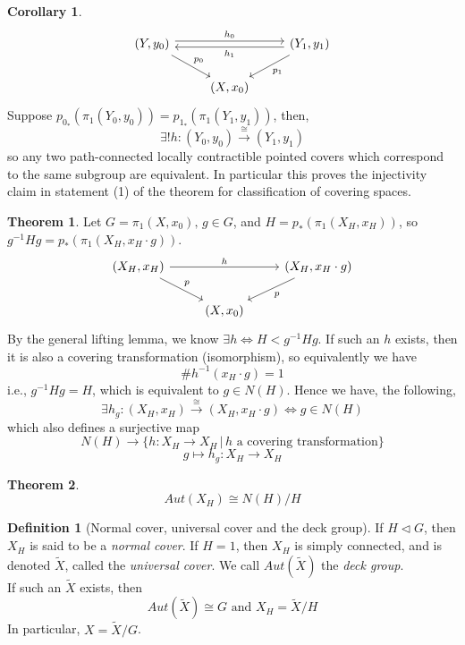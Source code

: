 \documentclass[a4paper,14pt]{extarticle}
\theoremstyle{definition}
\newtheorem*{theorem}{Theorem}
\newtheorem*{definition}{Definition}
\newtheorem*{corollary}{Corollary}
\begin{document}
\begin{corollary}
  \[
  \begin{tikzcd}
     (Y,y_0) \arrow[rr, shift left, "h_0"] \arrow{dr}{p_0} && (Y_1,y_1) \arrow[ll, shift left, "h_1"]{h_1}
     \arrow{dl}{p_1}  \\
     & (X,x_0)
  \end{tikzcd}
\]
Suppose $p_{0_*}(\pi_1(Y_0,y_0))=p_{1_*}(\pi_1(Y_1,y_1))$, then,
\[\exists!h:(Y_0,y_0)\xrightarrow{\cong}(Y_1,y_1)\]
so any two path-connected locally contractible pointed covers which correspond 
to the same subgroup are equivalent. In particular this proves the injectivity claim
in statement (1) of the theorem for classification of covering spaces.
\end{corollary}

\begin{theorem} Let $G=\pi_1(X,x_0), \,g\in G$, and $H=p_*(\pi_1(X_H,x_H))$, so 
  $g^{-1}Hg=p_*(\pi_1(X_H,x_H\cdot g))$.
  \[
    \begin{tikzcd}
       (X_H,x_H) \arrow[rr, "h"] \arrow{dr}{p} && (X_H,x_H\cdot g) 
       \arrow{dl}{p}  \\
       & (X,x_0)
    \end{tikzcd}
  \]
  By the general lifting lemma, we know $\exists h\iff H<g^{-1}Hg$. If such an $h$ exists,
  then it is also a covering transformation (isomorphism), so equivalently we have 
  \[\#h^{-1}(x_H\cdot g)=1\] i.e., $g^{-1}Hg=H$, which is equivalent to $g\in N(H)$. Hence 
  we have, the following, 
  \[\exists h_g:(X_H,x_H)\xrightarrow{\cong}(X_H,x_H\cdot g)\iff g\in N(H)\]
  which also defines a surjective map 
  \[N(H)\rightarrow \{h:X_H\rightarrow X_H\,|\,h\text{ a covering transformation}\}\]
  \[g\mapsto h_g:X_H\rightarrow X_H\]
\end{theorem}

\begin{theorem}
  \[Aut(X_H)\cong N(H)/H\]
\end{theorem}
\begin{definition}[Normal cover, universal cover and the deck group]
  If $H\triangleleft G$, then $X_H$ is said to be a \textit{normal cover}. If $H=1$, 
  then $X_H$ is simply connected, and is denoted $\tilde{X}$, called the \textit{universal
  cover}. We call $Aut(\tilde{X})$ the \textit{deck group}. \\

  \noindent 
  If such an $\tilde{X}$ exists, then \[Aut(\tilde{X})\cong G\text{ and }X_H=\tilde{X}/H\] In
  particular, $X=\tilde{X}/G$.
\end{definition}
\end{document}
